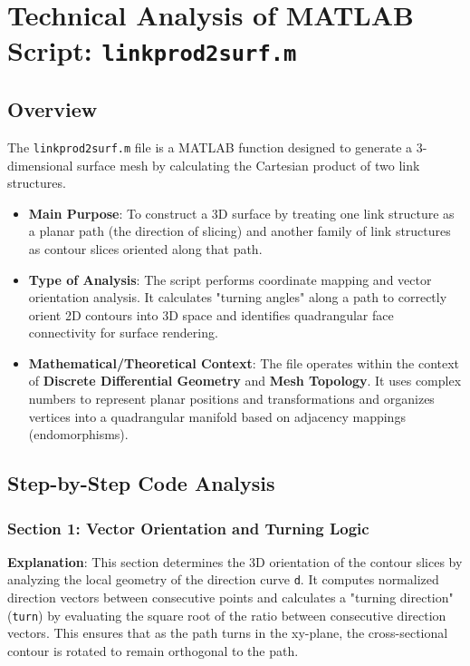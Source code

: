 
\chapter{Technical Analysis of MATLAB Script: \texttt{linkprod2surf.m}}
\date{}

\maketitle

\section{Overview}

The \texttt{linkprod2surf.m} file is a MATLAB function designed to generate a 3-dimensional surface mesh by calculating the Cartesian product of two link structures.

\begin{itemize}
\item \textbf{Main Purpose}: To construct a 3D surface by treating one link structure as a planar path (the direction of slicing) and another family of link structures as contour slices oriented along that path.
\item \textbf{Type of Analysis}: The script performs coordinate mapping and vector orientation analysis. It calculates "turning angles" along a path to correctly orient 2D contours into 3D space and identifies quadrangular face connectivity for surface rendering.
\item \textbf{Mathematical/Theoretical Context}: The file operates within the context of \textbf{Discrete Differential Geometry} and \textbf{Mesh Topology}. It uses complex numbers to represent planar positions and transformations and organizes vertices into a quadrangular manifold based on adjacency mappings (endomorphisms).
\end{itemize}

\section{Step-by-Step Code Analysis}

\subsection{Section 1: Vector Orientation and Turning Logic}
\textbf{Explanation}: This section determines the 3D orientation of the contour slices by analyzing the local geometry of the direction curve \texttt{d}. It computes normalized direction vectors between consecutive points and calculates a "turning direction" (\texttt{turn}) by evaluating the square root of the ratio between consecutive direction vectors. This ensures that as the path turns in the xy-plane, the cross-sectional contour is rotated to remain orthogonal to the path.

